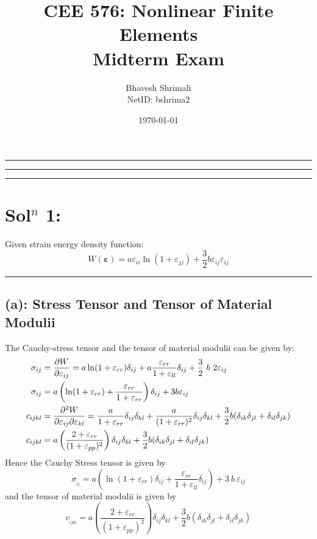 
\title{\bf CEE 576: Nonlinear Finite Elements \\ Midterm Exam}
\author{Bhavesh Shrimali \\ NetID: bshrima2}
\date{\today}

\maketitle \hrule \hrule \hrule
\section*{Sol$^n$ 1: }
Given strain energy density function: 
\[
W({\bm\varepsilon}) = a\varepsilon_{ii} \ln(1+\varepsilon_{jj}) + \frac{3}{2} b\varepsilon_{ij}\varepsilon_{ij}
\]\hrule
\subsection*{(a): Stress Tensor and Tensor of Material Modulii}
The Cauchy-stress tensor and the tensor of material modulii can be given by: 
\begin{align*}
\sigma_{ij}
& =\del{W}{\varepsilon_{ij}} = 
a\ln(1+\varepsilon_{rr})\delta_{ij} + a\frac{\varepsilon_{rr}}{1+\varepsilon_{ll}}\delta_{ij}
+ \frac{3}{2}\ 
b\ 
2\varepsilon_{ij}\\
\sigma_{ij}
& = 
a\left( 
\ln (1+\varepsilon_{rr}) + \frac{\varepsilon_{rr}}{1+\varepsilon_{rr}}
\right)\delta_{ij}
+3b\varepsilon_{ij}\\
c_{ijkl}
& = \frac{\partial^2 W}{\partial\varepsilon_{ij}\partial\varepsilon_{kl}} =
\frac{a}{1+\varepsilon_{rr}}\delta_{ij}\delta_{kl}
+\frac{a}{(1+\varepsilon_{rr})^2}\delta_{ij}\delta_{kl}
+\frac{3}{2}b(\delta_{ik}\delta_{jl}+\delta_{il}\delta_{jk})\\
c_{ijkl}
& = 
a\left(
\frac{2+\varepsilon_{rr}}{(1+\varepsilon_{pp})^2}
\right)\delta_{ij}\delta_{kl}
+\frac{3}{2}b(\delta_{ik}\delta_{jl}+\delta_{il}\delta_{jk})
\end{align*}
Hence the Cauchy Stress tensor is given by
\[
\boxed{\sigma_{_{ij}} = a\left( \ln(1+\varepsilon_{rr})\delta_{ij} + \frac{\varepsilon_{rr}}{1+\varepsilon_{ll}}\delta_{ij}\right)
+ 3\ 
b\ 
\varepsilon_{ij}}
\]
and the tensor of material modulii is given by
\[
\boxed{c_{_{ijkl}}=a\left(
\frac{2+\varepsilon_{rr}}{(1+\varepsilon_{pp})^2}
\right)\delta_{ij}\delta_{kl}
+\frac{3}{2}b(\delta_{ik}\delta_{jl}+\delta_{il}\delta_{jk})}
\]
